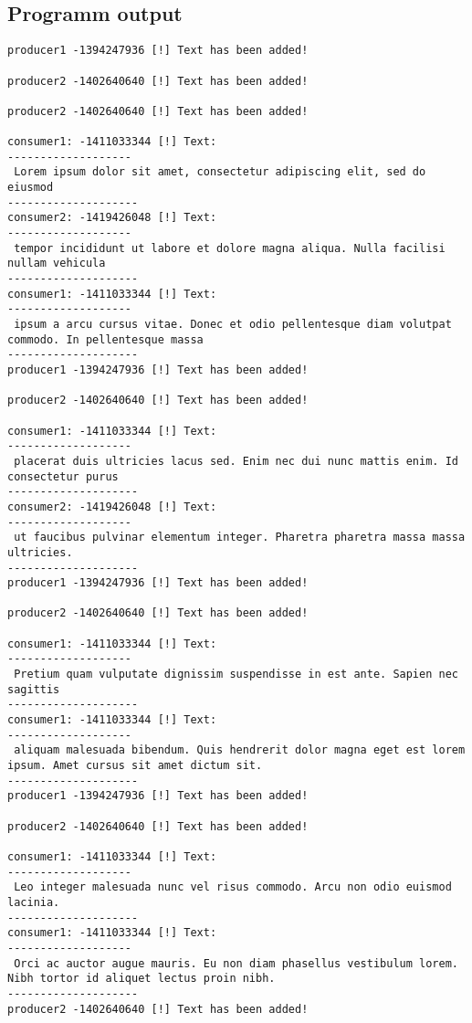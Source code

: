 \documentclass{article}
\begin{document}
\subsection{Programm output}
\normalsize
\begin{verbatim}
producer1 -1394247936 [!] Text has been added! 

producer2 -1402640640 [!] Text has been added! 

producer2 -1402640640 [!] Text has been added! 

consumer1: -1411033344 [!] Text: 
-------------------
 Lorem ipsum dolor sit amet, consectetur adipiscing elit, sed do eiusmod 
--------------------
consumer2: -1419426048 [!] Text: 
-------------------
 tempor incididunt ut labore et dolore magna aliqua. Nulla facilisi nullam vehicula 
--------------------
consumer1: -1411033344 [!] Text: 
-------------------
 ipsum a arcu cursus vitae. Donec et odio pellentesque diam volutpat commodo. In pellentesque massa
--------------------
producer1 -1394247936 [!] Text has been added! 

producer2 -1402640640 [!] Text has been added! 

consumer1: -1411033344 [!] Text: 
-------------------
 placerat duis ultricies lacus sed. Enim nec dui nunc mattis enim. Id consectetur purus
--------------------
consumer2: -1419426048 [!] Text: 
-------------------
 ut faucibus pulvinar elementum integer. Pharetra pharetra massa massa ultricies.
--------------------
producer1 -1394247936 [!] Text has been added! 

producer2 -1402640640 [!] Text has been added! 

consumer1: -1411033344 [!] Text: 
-------------------
 Pretium quam vulputate dignissim suspendisse in est ante. Sapien nec sagittis
--------------------
consumer1: -1411033344 [!] Text: 
-------------------
 aliquam malesuada bibendum. Quis hendrerit dolor magna eget est lorem ipsum. Amet cursus sit amet dictum sit.
--------------------
producer1 -1394247936 [!] Text has been added! 

producer2 -1402640640 [!] Text has been added! 

consumer1: -1411033344 [!] Text: 
-------------------
 Leo integer malesuada nunc vel risus commodo. Arcu non odio euismod lacinia. 
--------------------
consumer1: -1411033344 [!] Text: 
-------------------
 Orci ac auctor augue mauris. Eu non diam phasellus vestibulum lorem. Nibh tortor id aliquet lectus proin nibh.
--------------------
producer2 -1402640640 [!] Text has been added! 


\end{verbatim}
\end{document}
